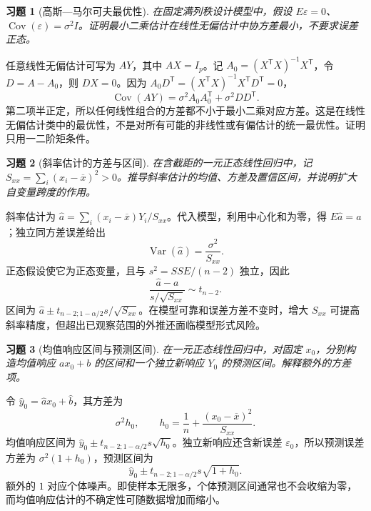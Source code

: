 \documentclass[UTF8,12pt,a4paper,fontset=fandol]{ctexart}
\newtheorem{exercise}{习题}[section]
\begin{document}
\begin{exercise}[高斯—马尔可夫最优性]\label{q:B16.2}
在固定满列秩设计模型中，假设 $E\varepsilon=0$、$\operatorname{Cov}(\varepsilon)=\sigma^2I$。证明最小二乘估计在线性无偏估计中协方差最小，不要求误差正态。\par{}
\end{exercise}

\begin{solve}\label{a:B16.2}任意线性无偏估计可写为 $AY$，其中 $AX=I_p$。记 $A_0=(X^\mathsf TX)^{-1}X^\mathsf T$，令 $D=A-A_0$，则 $DX=0$。因为 $A_0D^\mathsf T=(X^\mathsf TX)^{-1}X^\mathsf TD^\mathsf T=0$，\[\operatorname{Cov}(AY)=\sigma^2A_0A_0^\mathsf T+\sigma^2DD^\mathsf T.\]第二项半正定，所以任何线性组合的方差都不小于最小二乘对应方差。这是在线性无偏估计类中的最优性，不是对所有可能的非线性或有偏估计的统一最优性。证明只用一二阶矩条件。\end{solve}

\begin{exercise}[斜率估计的方差与区间]\label{q:B16.3}
在含截距的一元正态线性回归中，记 $S_{xx}=\sum_i(x_i-\overline x)^2>0$。推导斜率估计的均值、方差及置信区间，并说明扩大自变量跨度的作用。\par{}
\end{exercise}

\begin{solve}\label{a:B16.3}斜率估计为 $\widehat a=\sum_i(x_i-\overline x)Y_i/S_{xx}$。代入模型，利用中心化和为零，得 $E\widehat a=a$；独立同方差误差给出\[\operatorname{Var}(\widehat a)=\frac{\sigma^2}{S_{xx}}.\]正态假设使它为正态变量，且与 $s^2=SSE/(n-2)$ 独立，因此\[\frac{\widehat a-a}{s/\sqrt{S_{xx}}}\sim t_{n-2}.\]区间为 $\widehat a\pm t_{n-2;1-\alpha/2}s/\sqrt{S_{xx}}$。在模型可靠和误差方差不变时，增大 $S_{xx}$ 可提高斜率精度，但超出已观察范围的外推还面临模型形式风险。\end{solve}

\begin{exercise}[均值响应区间与预测区间]\label{q:B16.4}
在一元正态线性回归中，对固定 $x_0$，分别构造均值响应 $a x_0+b$ 的区间和一个独立新响应 $Y_0$ 的预测区间。解释额外的方差项。\par{}
\end{exercise}

\begin{solve}\label{a:B16.4}令 $\widehat y_0=\widehat a x_0+\widehat b$，其方差为\[\sigma^2h_0,\qquad h_0=\frac1n+\frac{(x_0-\overline x)^2}{S_{xx}}.\]均值响应区间为 $\widehat y_0\pm t_{n-2;1-\alpha/2}s\sqrt{h_0}$。独立新响应还含新误差 $\varepsilon_0$，所以预测误差方差为 $\sigma^2(1+h_0)$，预测区间为\[\widehat y_0\pm t_{n-2;1-\alpha/2}s\sqrt{1+h_0}.\]额外的 $1$ 对应个体噪声。即使样本无限多，个体预测区间通常也不会收缩为零，而均值响应估计的不确定性可随数据增加而缩小。\end{solve}
\end{document}
